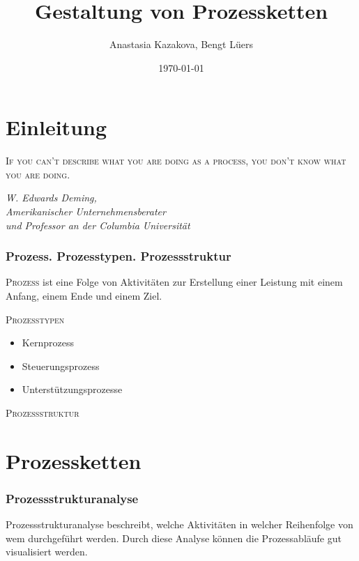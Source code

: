 \documentclass{beamer}
\title{Gestaltung von Prozessketten}
\author[A. Kazakova, B. Lüers]{Anastasia Kazakova, Bengt Lüers}
\institute[Universität Oldenburg]{
  \inst{}Fakultät 2 - Informatik, Wirtschafts- und Rechtswissenschaften}
\date{\today}
\begin{document}
 \frame{\titlepage}


 \section[Einleitung]{Einleitung}

 \begin{frame}


 \textsc{\flqq If you can't describe what you are doing as a process, you don't know what you are doing.\frqq}
 \\
 \medskip
 \begin{flushright}
   \begin{small}
    \emph{\textit{W. Edwards Deming, \\
        Amerikanischer Unternehmensberater \\
        und Professor an der Columbia Universität}}
  \end{small}
 \end{flushright}

 \end{frame}

 \begin{frame}
  \frametitle{Prozess. Prozesstypen. Prozessstruktur}

  \textsc{Prozess} ist eine Folge von Aktivitäten zur Erstellung einer Leistung mit einem Anfang, einem Ende und einem Ziel.

\bigskip
  \textsc{Prozesstypen}\\
  \begin{itemize}
    \item Kernprozess
    \item Steuerungsprozess
    \item Unterstützungsprozesse
  \end{itemize}

\bigskip

\textsc{Prozessstruktur}

\end{frame}




 \section[Prozessketten]{Prozessketten}
 \begin{frame}
  \frametitle{Prozessstrukturanalyse}

  Prozessstrukturanalyse beschreibt, welche Aktivitäten in welcher Reihenfolge von wem durchgeführt werden. Durch diese Analyse können die Prozessabläufe gut visualisiert werden. \\
    \end{frame}
\end{document}
